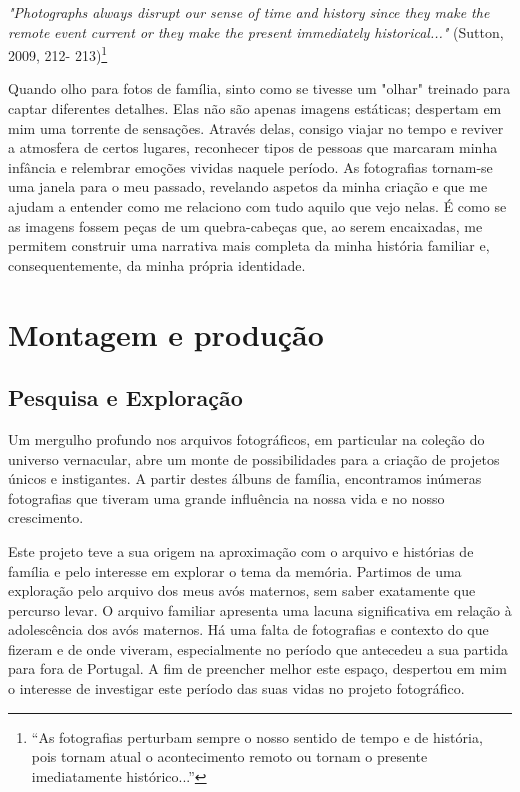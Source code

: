 \documentclass{article}
\begin{document}
 


 




\textit{"Photographs always disrupt our sense of time and history since they make the remote }
\textit{event current or they make the present immediately historical..."} (Sutton, 2009, 212-
213)\footnote{“As fotografias perturbam sempre o nosso sentido de tempo e de história, pois tornam atual o acontecimento remoto ou tornam o presente imediatamente histórico...” } 
 
Quando olho para fotos de família, sinto como se tivesse um "olhar" treinado para 
captar diferentes detalhes. Elas não são apenas imagens estáticas; despertam em mim uma 
torrente de sensações. Através delas, consigo viajar no tempo e reviver a atmosfera de 
certos  lugares,  reconhecer  tipos  de  pessoas  que  marcaram  minha  infância  e  relembrar 
emoções  vividas  naquele  período.  As  fotografias  tornam-se  uma  janela  para  o  meu 
passado,  revelando  aspetos  da  minha  criação  e  que  me  ajudam  a  entender  como  me 
relaciono com tudo aquilo que vejo nelas. É como se as imagens fossem peças de um 
quebra-cabeças  que,  ao  serem  encaixadas,  me  permitem  construir  uma  narrativa  mais 
completa da minha história familiar e, consequentemente, da minha própria identidade. 
 
 
 


\section{Montagem e produção  }
\subsection{{{Pesquisa e Exploração }}}
 
 
Um mergulho profundo nos arquivos fotográficos, em particular na coleção do 
universo vernacular, abre um monte de possibilidades para a criação de projetos únicos e 
instigantes.  A  partir  destes  álbuns  de  família,  encontramos  inúmeras  fotografias  que 
tiveram uma grande influência na nossa vida e no nosso crescimento.  
 
 
Este projeto teve a sua origem na aproximação com o arquivo e histórias de família 
e pelo interesse em explorar o tema da memória. Partimos de uma exploração pelo arquivo 
dos meus avós maternos, sem saber exatamente que percurso levar. O arquivo familiar 
apresenta uma lacuna significativa em relação à adolescência dos avós maternos. Há uma 
falta  de  fotografias  e  contexto  do  que  fizeram  e  de  onde  viveram,  especialmente  no 
período que antecedeu a sua partida para fora de Portugal. A fim de preencher melhor 
este espaço, despertou em mim o interesse de investigar este período das suas vidas no 
projeto fotográfico. 
 
\end{document}
